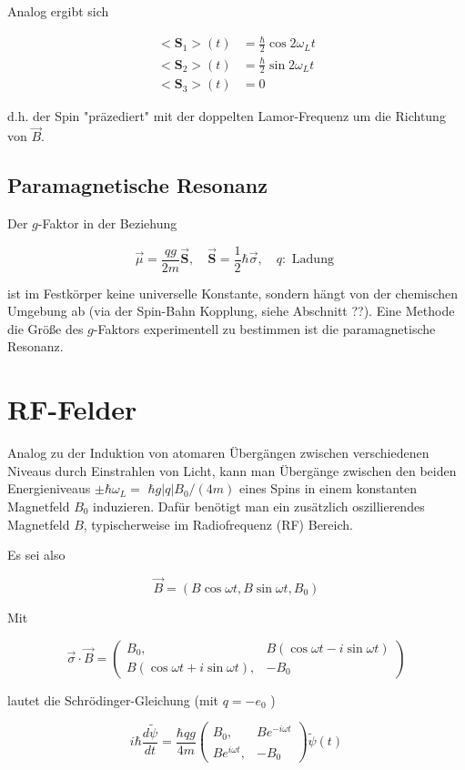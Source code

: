 \documentclass[10pt, letterpaper]{article}
\begin{document}
Analog ergibt sich

$$
\begin{aligned}
<\mathbf{S}_{1}>(t) & =\frac{\hbar}{2} \cos 2 \omega_{L} t \\
<\mathbf{S}_{2}>(t) & =\frac{\hbar}{2} \sin 2 \omega_{L} t \\
<\mathbf{S}_{3}>(t) & =0
\end{aligned}
$$

d.h. der Spin "präzediert" mit der doppelten Lamor-Frequenz um die Richtung von $\vec{B}$.

\subsection*{Paramagnetische Resonanz}
Der $g$-Faktor in der Beziehung

$$
\vec{\mu}=\frac{q g}{2 m} \overrightarrow{\mathbf{S}}, \quad \overrightarrow{\mathbf{S}}=\frac{1}{2} \hbar \vec{\sigma}, \quad q: \text { Ladung }
$$

ist im Festkörper keine universelle Konstante, sondern hängt von der chemischen Umgebung ab (via der Spin-Bahn Kopplung, siehe Abschnitt ??). Eine Methode die Größe des $g$-Faktors experimentell zu bestimmen ist die paramagnetische Resonanz.

\section*{RF-Felder}
Analog zu der Induktion von atomaren Übergängen zwischen verschiedenen Niveaus durch Einstrahlen von Licht, kann man Übergänge zwischen den beiden Energieniveaus $\pm \hbar \omega_{L}=$ $\hbar g|q| B_{0} /(4 m)$ eines Spins in einem konstanten Magnetfeld $B_{0}$ induzieren. Dafür benötigt man ein zusätzlich oszillierendes Magnetfeld $B$, typischerweise im Radiofrequenz (RF) Bereich.

Es sei also

$$
\vec{B}=\left(B \cos \omega t, B \sin \omega t, B_{0}\right)
$$

Mit

$$
\vec{\sigma} \cdot \vec{B}=\left(\begin{array}{cc}
B_{0}, & B(\cos \omega t-i \sin \omega t) \\
B(\cos \omega t+i \sin \omega t), & -B_{0}
\end{array}\right)
$$

lautet die Schrödinger-Gleichung (mit $q=-e_{0}$ )

$$
i \hbar \frac{d \tilde{\psi}}{d t}=\frac{\hbar q g}{4 m}\left(\begin{array}{cc}
B_{0}, & B e^{-i \omega t} \\
B e^{i \omega t}, & -B_{0}
\end{array}\right) \tilde{\psi}(t)
$$
\end{document}
